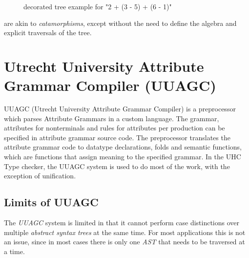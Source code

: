 \begin{figure}[H]
\centering
{}
\caption{decorated tree example for "2 + (3 - 5) + (6 - 1)"}
\label{fig.example2.decoratedtree}
\end{figure}

\Ags are akin to \emph{catamorphisms}, except without the need to define the algebra and explicit traversals of the tree.

\section{Utrecht University Attribute Grammar Compiler (UUAGC)}
UUAGC (Utrecht University Attribute Grammar Compiler) is a preprocessor which parses Attribute Grammars in a custom language.
The grammar, attributes for nonterminals and rules for attributes per production can be specified in attribute grammar source code. The preprocessor translates the attribute grammar code to datatype declarations, folds and semantic functions, which are functions that assign meaning to the specified grammar. In the UHC Type checker, the UUAGC system is used to do most of the work, with the exception of unification.

\subsection{Limits of UUAGC}
The \emph{UUAGC} system is limited in that it cannot perform case distinctions over multiple \emph{abstract syntax trees} at the same time\cite{visitag}. For most applications this is not an issue, since in most cases there is only one \emph{AST} that needs to be traversed at a time. 

